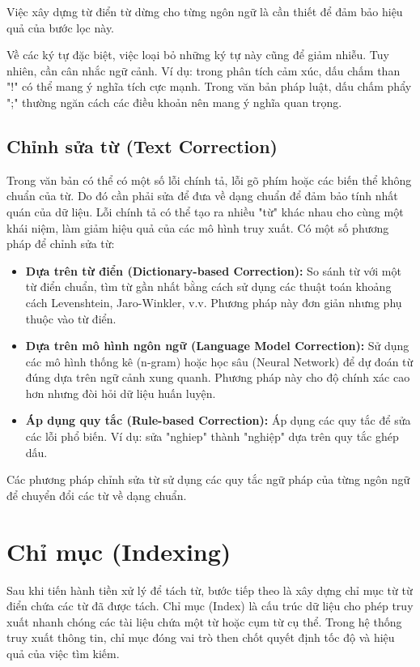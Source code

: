 \documentclass[../BTL.tex]{subfiles}
\begin{document}
Việc xây dựng từ điển từ dừng cho từng ngôn ngữ là cần thiết để đảm bảo hiệu quả của bước lọc này.

Về các ký tự đặc biệt, việc loại bỏ những ký tự này cũng để giảm nhiễu. Tuy nhiên, cần cân nhắc ngữ cảnh. Ví dụ: trong phân tích cảm xúc, dấu chấm than "!" có thể mang ý nghĩa tích cực mạnh. Trong văn bản pháp luật, dấu chấm phẩy ";" thường ngăn cách các điều khoản nên mang ý nghĩa quan trọng.

\subsection{Chỉnh sửa từ (Text Correction)}
Trong văn bản có thể có một số lỗi chính tả, lỗi gõ phím hoặc các biến thể không chuẩn của từ. Do đó cần phải sửa để đưa về dạng chuẩn để đảm bảo tính nhất quán của dữ liệu. Lỗi chính tả có thể tạo ra nhiều "từ" khác nhau cho cùng một khái niệm, làm giảm hiệu quả của các mô hình truy xuất. Có một số phương pháp để chỉnh sửa từ:

\begin{itemize}
    \item \textbf{Dựa trên từ điển (Dictionary-based Correction):} So sánh từ với một từ điển chuẩn, tìm từ gần nhất bằng cách sử dụng các thuật toán khoảng cách Levenshtein, Jaro-Winkler, v.v. Phương pháp này đơn giản nhưng phụ thuộc vào từ điển.
    
    \item \textbf{Dựa trên mô hình ngôn ngữ (Language Model Correction):} Sử dụng các mô hình thống kê (n-gram) hoặc học sâu (Neural Network) để dự đoán từ đúng dựa trên ngữ cảnh xung quanh. Phương pháp này cho độ chính xác cao hơn nhưng đòi hỏi dữ liệu huấn luyện.
    
    \item \textbf{Áp dụng quy tắc (Rule-based Correction):} Áp dụng các quy tắc để sửa các lỗi phổ biến. Ví dụ: sửa "nghiep" thành "nghiệp" dựa trên quy tắc ghép dấu.
\end{itemize}

Các phương pháp chỉnh sửa từ sử dụng các quy tắc ngữ pháp của từng ngôn ngữ để chuyển đổi các từ về dạng chuẩn.

\section{Chỉ mục (Indexing)}
Sau khi tiến hành tiền xử lý để tách từ, bước tiếp theo là xây dựng chỉ mục từ từ điển chứa các từ đã được tách. Chỉ mục (Index) là cấu trúc dữ liệu cho phép truy xuất nhanh chóng các tài liệu chứa một từ hoặc cụm từ cụ thể. Trong hệ thống truy xuất thông tin, chỉ mục đóng vai trò then chốt quyết định tốc độ và hiệu quả của việc tìm kiếm.
\end{document}
